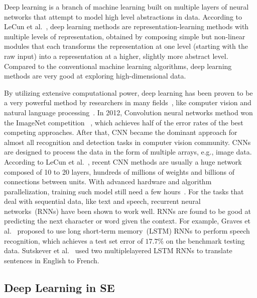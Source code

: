 \documentclass[sigconf]{acmart}
\theoremstyle{break}
\begin{document}
Deep learning is a branch of machine learning built on multiple layers of neural networks that attempt to model high level abstractions in data. According to LeCun et al.~\cite{lecun2015deep}, deep learning methods are representation-learning methods with multiple levels of representation,
obtained by composing simple but non-linear modules that each
transforms the representation at one level (starting with the raw input)
into a representation at a higher, slightly more abstract level. Compared to the conventional
machine learning algorithms, deep learning methods are very good at exploring high-dimensional data.

By utilizing extensive computational power, 
deep learning has been proven to be a very powerful method 
by researchers in many fields~\cite{lecun2015deep}, like computer vision and natural language processing~\cite{krizhevsky2012imagenet,mikolov2013distributed,sutskever2014sequence,schmidhuber2015deep,arel2010deep}. In 2012, 
Convolution neural networks method won the ImageNet competition ~\cite{krizhevsky2012imagenet},
which achieves half of the error rates of the best competing
approaches. After that, CNN became the dominant approach for almost all recognition
and detection tasks in computer vision community. CNNs are designed to process the data in the form of multiple arrays, e.g., image data. According to LeCun et al.~\cite{lecun2015deep},
recent CNN methods are usually a huge network composed of 10 to 20 layers, hundreds of millions of weights and billions of connections between units. With advanced hardware and algorithm parallelization, training such model still need a few hours~\cite{lecun2015deep}. 
For the tasks that deal with sequential data, like text and speech, recurrent neural networks~(RNNs) have been shown to work well. 
RNNs are found to be good at predicting the next character or word given the context. For example, Graves et al.~\cite{graves2013speech} proposed to use long short-term memory~(LSTM) RNNs to perform speech recognition, 
which achieves a test set error of $17.7\%$ on the benchmark testing data. Sutskever et al.~\cite{sutskever2014sequence} used two multiplelayered LSTM RNNs to translate sentences in English to French.




\subsection{Deep Learning in SE}
\end{document}
